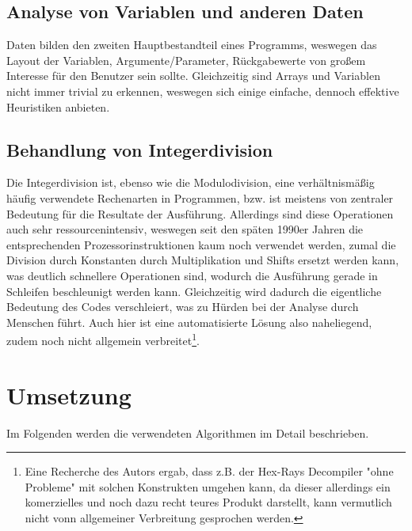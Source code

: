 \documentclass[11pt]{article} %
\begin{document}
\begin{multicols}{2}
\subsection{Analyse von Variablen und anderen Daten}
Daten bilden den zweiten Hauptbestandteil eines Programms, weswegen das Layout der Variablen, Argumente/Parameter, Rückgabewerte von großem Interesse für den Benutzer sein sollte. Gleichzeitig sind Arrays und Variablen nicht immer trivial zu erkennen, weswegen sich einige einfache, dennoch effektive Heuristiken anbieten.

\subsection{Behandlung von Integerdivision}
Die Integerdivision ist, ebenso wie die Modulodivision, eine verhältnismäßig häufig verwendete Rechenarten in Programmen, bzw. ist meistens von zentraler Bedeutung für die Resultate der Ausführung. Allerdings sind diese Operationen auch sehr ressourcenintensiv, weswegen seit den späten 1990er Jahren die entsprechenden Prozessorinstruktionen kaum noch verwendet werden, zumal die Division durch Konstanten durch Multiplikation und Shifts ersetzt werden kann, was deutlich schnellere Operationen sind\cite{division:2}, wodurch die Ausführung gerade in Schleifen beschleunigt werden kann. Gleichzeitig wird dadurch die eigentliche Bedeutung des Codes verschleiert, was zu Hürden bei der Analyse durch Menschen führt. Auch hier ist eine automatisierte Lösung also naheliegend, zudem noch nicht allgemein verbreitet\footnote{Eine Recherche des Autors ergab, dass z.B. der Hex-Rays Decompiler "ohne Probleme" mit solchen Konstrukten umgehen kann, da dieser allerdings ein komerzielles und noch dazu recht teures Produkt darstellt, kann vermutlich nicht vonn allgemeiner Verbreitung gesprochen werden.}.

\section{Umsetzung}
Im Folgenden werden die verwendeten Algorithmen im Detail beschrieben.


\end{multicols}
\end{document}
